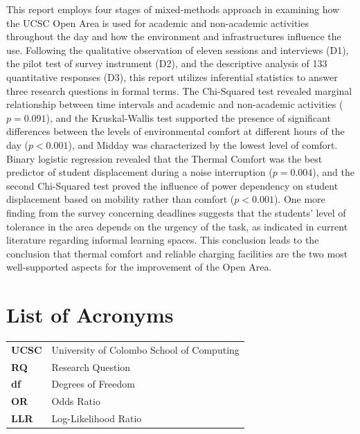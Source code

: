\documentclass[12pt, a4paper]{report}
\begin{document}
This report employs four stages of mixed-methods approach in examining how the UCSC Open Area is used for academic and non-academic activities throughout the day and how the environment and infrastructures influence the use. Following the qualitative observation of eleven sessions and interviews (D1), the pilot test of survey instrument (D2), and the descriptive analysis of 133 quantitative responses (D3), this report utilizes inferential statistics to answer three research questions in formal terms. The Chi-Squared test revealed marginal relationship between time intervals and academic and non-academic activities ($p = 0.091$), and the Kruskal-Wallis test supported the presence of significant differences between the levels of environmental comfort at different hours of the day ($p < 0.001$), and Midday was characterized by the lowest level of comfort. Binary logistic regression revealed that the Thermal Comfort was the best predictor of student displacement during a noise interruption ($p = 0.004$), and the second Chi-Squared test proved the influence of power dependency on student displacement based on mobility rather than comfort ($p < 0.001$).
One more finding from the survey concerning deadlines suggests that the students' level of tolerance in the area depends on the urgency of the task, as indicated in current literature regarding informal learning spaces. This conclusion leads to the conclusion that thermal comfort and reliable charging facilities are the two most well-supported aspects for the improvement of the Open Area.

\tableofcontents
\clearpage

\listoffigures
{}
\clearpage

\chapter*{List of Acronyms}
\begin{tabular}{ll}
\textbf{UCSC} & University of Colombo School of Computing \\
\textbf{RQ}   & Research Question \\
\textbf{df}   & Degrees of Freedom \\
\textbf{OR}   & Odds Ratio \\
\textbf{LLR}  & Log-Likelihood Ratio \\
\end{tabular}
\clearpage

\end{document}
